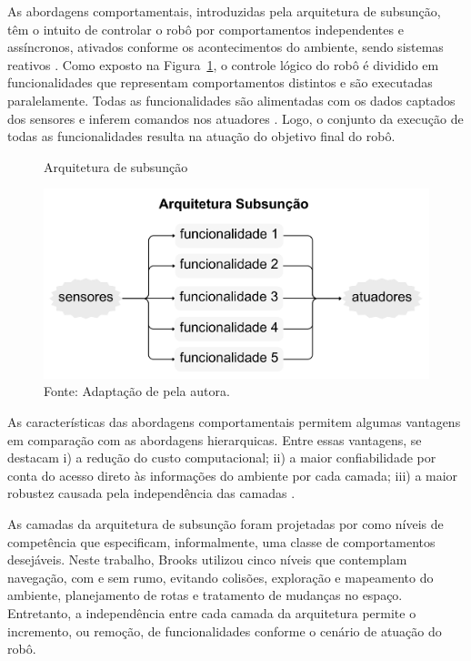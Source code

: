 As abordagens comportamentais, introduzidas pela arquitetura de subsunção, têm o intuito de controlar o robô por comportamentos independentes e assíncronos, ativados conforme os acontecimentos do ambiente, sendo sistemas reativos \cite{seqlam:2020, toroco:2022}. Como exposto na Figura~\ref{fig:subsuncao}, o controle lógico do robô é dividido em funcionalidades que representam comportamentos distintos e são executadas paralelamente. Todas as funcionalidades são alimentadas com os dados captados dos sensores e inferem comandos nos atuadores \cite{seqlam:2020,brooks85}. Logo, o conjunto da execução de todas as funcionalidades resulta na atuação do objetivo final do robô.

\begin{figure}[h]
    \centering
    \caption{Arquitetura de subsunção}
    \includegraphics[scale=0.4]{subsuncao.png}
    \caption*{Fonte: Adaptação de \citet{brooks85} pela autora.}
    \label{fig:subsuncao}
\end{figure}

As características das abordagens comportamentais permitem algumas vantagens em comparação com as abordagens hierarquicas. Entre essas vantagens, se destacam i) a redução do custo computacional; ii) a maior confiabilidade por conta do acesso direto às informações do ambiente por cada camada; iii) a maior robustez causada pela independência das camadas \cite{seqlam:2020,brooks85, toroco:2022}. 

As camadas da arquitetura de subsunção foram projetadas por \citet{brooks85} como níveis de competência que especificam, informalmente, uma classe de comportamentos desejáveis. Neste trabalho, Brooks utilizou cinco níveis que contemplam navegação, com e sem rumo, evitando colisões, exploração e mapeamento do ambiente, planejamento de rotas e tratamento de mudanças no espaço. Entretanto, a independência entre cada camada da arquitetura permite o incremento, ou remoção, de funcionalidades conforme o cenário de atuação do robô. 

